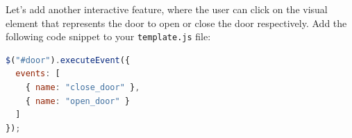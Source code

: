 Let's add another interactive feature, where the user can click on the visual element that represents the door to open or close the door respectively.
%
Add the following code snippet to your \texttt{template.js} file:
\begin{lstlisting}[language=JavaScript, caption={Interaction with the Lift Door (JavaScript)}]
$("#door").executeEvent({
  events: [
    { name: "close_door" }, 
    { name: "open_door" }
  ]
});
\end{lstlisting}

